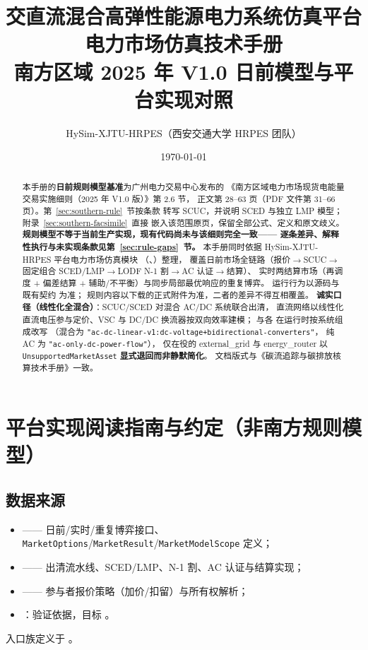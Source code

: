\documentclass[UTF8,fontset=fandol,a4paper,11pt]{ctexart}
\title{\textbf{交直流混合高弹性能源电力系统仿真平台}\\[0.5em]
       {\Large 电力市场仿真技术手册}\\[0.3em]
       {\large 南方区域 2025 年 V1.0 日前模型与平台实现对照}}
\author{HySim-XJTU-HRPES（西安交通大学 HRPES 团队）}
\date{\today}
\begin{document}
\maketitle
\begin{abstract}
\noindent 本手册的\textbf{日前规则模型基准}为广州电力交易中心发布的
《南方区域电力市场现货电能量交易实施细则（2025 年 V1.0 版）》第 2.6 节，
正文第 28--63 页（PDF 文件第 31--66 页）。第~\ref{sec:southern-rule}~节按条款
转写 SCUC，并说明 SCED 与独立 LMP 模型；附录~\ref{sec:southern-facsimile}~直接
嵌入该范围原页，保留全部公式、定义和原文歧义。
\textbf{规则模型不等于当前生产实现，现有代码尚未与该细则完全一致——
逐条差异、解释性执行与未实现条款见第~\ref{sec:rule-gaps}~节。}
本手册同时依据 HySim-XJTU-HRPES 平台电力市场仿真模块
（、）整理，
覆盖日前市场全链路（报价$\to$SCUC$\to$固定组合 SCED/LMP$\to$LODF N-1 割$\to$AC 认证$\to$结算）、
实时两结算市场（再调度 + 偏差结算 + 辅助/不平衡）与同步局部最优响应的重复博弈。
运行行为以源码与既有契约  为准；
规则内容以下载的正式附件为准，二者的差异不得互相覆盖。
\textbf{诚实口径（线性化全混合）}：SCUC/SCED 对混合 AC/DC 系统联合出清，
直流网络以线性化直流电压参与定价、VSC 与 DC/DC 换流器按双向效率建模；
 与各  在运行时按系统组成改写
（混合为 \texttt{"ac-dc-linear-v1:dc-voltage+bidirectional-converters"}，
纯 AC 为 \texttt{"ac-only-dc-power-flow"}），
仅在役的 external\_grid 与 energy\_router 以
\texttt{UnsupportedMarketAsset} \textbf{显式退回而非静默简化}。
文档版式与《碳流追踪与碳排放核算技术手册》一致。
\end{abstract}

\tableofcontents
\newpage





\section{平台实现阅读指南与约定（非南方规则模型）}
\subsection{数据来源}
\begin{itemize}
  \item {} —— 日前/实时/重复博弈接口、
        \texttt{MarketOptions}/\texttt{MarketResult}/\texttt{MarketModelScope} 定义；
  \item {} —— 出清流水线、SCED/LMP、N-1 割、AC 认证与结算实现；
  \item {} —— 参与者报价策略（加价/扣留）与所有权解析；
  \item {}：验证依据，目标
        。
\end{itemize}
入口族定义于 。
\end{document}
